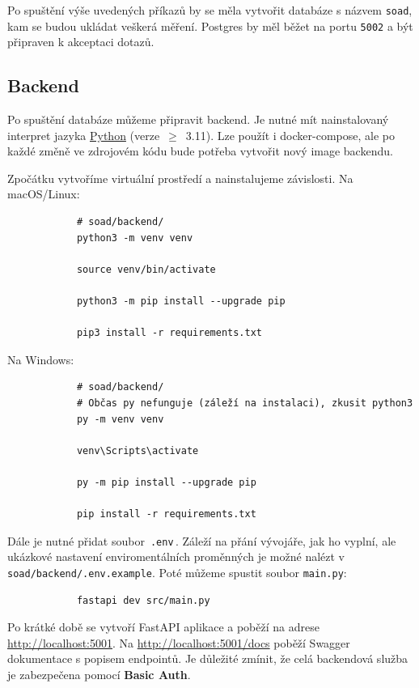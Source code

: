 \documentclass[12pt]{article}
\begin{document}
\begin{teamwork}
        Po spuštění výše uvedených příkazů by se měla vytvořit databáze s názvem \texttt{soad}, kam se budou ukládat veškerá měření.
        Postgres by měl běžet na portu \texttt{5002} a být připraven k akceptaci dotazů.

        \subsection{Backend}\label{subsec:backend}

        Po spuštění databáze můžeme připravit backend.
        Je nutné mít nainstalovaný interpret jazyka \href{https://www.python.org/downloads/}{Python} (verze~$\geq$~3.11).
        Lze použít i docker-compose, ale po každé změně ve zdrojovém kódu bude potřeba vytvořit nový image backendu.

        Zpočátku vytvoříme virtuální prostředí a nainstalujeme závislosti.
        Na macOS/Linux:

        \begin{verbatim}
            # soad/backend/
            python3 -m venv venv

            source venv/bin/activate

            python3 -m pip install --upgrade pip

            pip3 install -r requirements.txt
        \end{verbatim}

        Na Windows:

        \begin{verbatim}
            # soad/backend/
            # Občas py nefunguje (záleží na instalaci), zkusit python3
            py -m venv venv

            venv\Scripts\activate

            py -m pip install --upgrade pip

            pip install -r requirements.txt
        \end{verbatim}

        Dále je nutné přidat soubor \,\texttt{.env}\,.
        Záleží na přání vývojáře, jak ho vyplní, ale ukázkové nastavení enviromentálních
        proměnných je možné nalézt v \texttt{soad/backend/.env.example}.
        Poté můžeme spustit soubor \texttt{main.py}:

        \begin{verbatim}
            fastapi dev src/main.py
        \end{verbatim}

        Po krátké době se vytvoří FastAPI aplikace a poběží na adrese \href{http://localhost:5001}{http://localhost:5001}.
        Na \href{http://localhost:5001/docs}{http://localhost:5001/docs} poběží Swagger dokumentace s popisem endpointů.
        Je důležité zmínit, že celá backendová služba je zabezpečena pomocí \textbf{Basic Auth}.


\end{teamwork}
\end{document}
